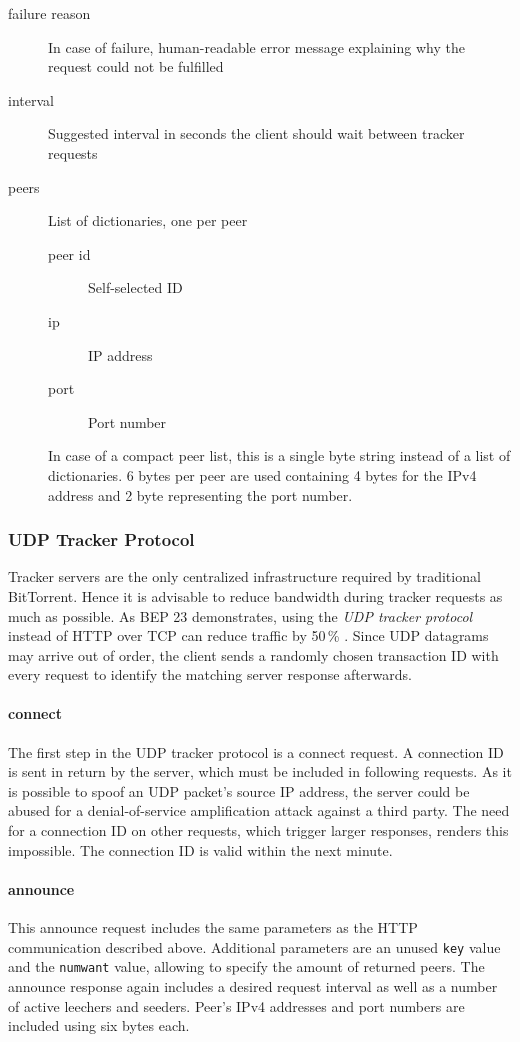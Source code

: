 \documentclass[10pt, a4paper, twoside]{scrartcl}
\renewcommand{\_}{\origunderscore\allowbreak}
\begin{document}
\begin{description}
  \item[failure reason] In case of failure, human-readable error message explaining why the request could not be fulfilled
  \item[interval] Suggested interval in seconds the client should wait between tracker requests
  \item[peers] List of dictionaries, one per peer
  \begin{description}
    \item[peer id] Self-selected ID
    \item[ip] IP address
    \item[port] Port number
  \end{description}

  In case of a compact peer list, this is a single byte string instead of a list of dictionaries. 6 bytes per peer are used containing 4 bytes for the IPv4 address and 2 byte representing the port number.
\end{description}

\subsubsection{UDP Tracker Protocol}
Tracker servers are the only centralized infrastructure required by traditional BitTorrent. Hence it is advisable to reduce bandwidth during tracker requests as much as possible. As BEP 23 demonstrates, using the \emph{UDP tracker protocol} instead of HTTP over TCP can reduce traffic by 50\,\% \cite{bep15}. Since UDP datagrams may arrive out of order, the client sends a randomly chosen transaction ID with every request to identify the matching server response afterwards.

\paragraph{connect}
The first step in the UDP tracker protocol is a connect request. A connection ID is sent in return by the server, which must be included in following requests. As it is possible to spoof an UDP packet's source IP address, the server could be abused for a denial-of-service amplification attack against a third party. The need for a connection ID on other requests, which trigger larger responses, renders this impossible. The connection ID is valid within the next minute.

\paragraph{announce}
This announce request includes the same parameters as the HTTP communication described above. Additional parameters are an unused \texttt{key} value and the \texttt{num\_want} value, allowing to specify the amount of returned peers. The announce response again includes a desired request interval as well as a number of active leechers and seeders. Peer's IPv4 addresses and port numbers are included using six bytes each.
\end{document}
